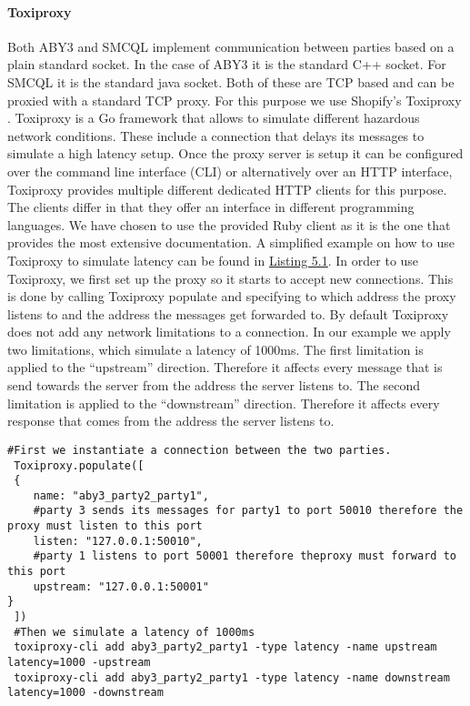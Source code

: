  \paragraph{Toxiproxy}
 Both ABY3 and SMCQL implement communication between parties based on a plain standard socket. In the case of ABY3 it is the standard C++ socket. For SMCQL it is the standard java socket. Both of these are TCP based and can be proxied with a standard TCP proxy. For this purpose we use Shopify's Toxiproxy \cite{toxiproxy}. Toxiproxy is a Go framework that allows to simulate different hazardous network conditions. These include a connection that delays its messages to simulate a high latency setup. Once the proxy server is setup it can be configured over the command line interface (CLI) or alternatively over an HTTP interface, Toxiproxy provides multiple different dedicated HTTP clients for this purpose. The clients differ in that they offer an interface in different programming languages. We have chosen to use the provided Ruby client as it is the one that provides the most extensive documentation. 
 A simplified example on how to use Toxiproxy to simulate latency can be found in \hyperref[the_label]{Listing 5.1}. In order to use Toxiproxy, we first set up the proxy so it starts to accept new connections. This is done by calling Toxiproxy populate and specifying to which address the proxy listens to and the address the messages get forwarded to.
 By default Toxiproxy does not add any network limitations to a connection. In our example we apply two limitations, which simulate a latency of 1000ms. The first limitation is applied to the ``upstream'' direction. Therefore it affects every message that is send towards the server from the address the server listens to. The second limitation is applied to the ``downstream'' direction. Therefore it affects every response that comes from the address the server listens to.    
 
 \label{Toxi_label}				
 \begin{lstlisting}[caption={Setting up a proxy that simulates latency between two parties with Toxiporxy}]
 #First we instantiate a connection between the two parties. 
 Toxiproxy.populate([
 {
 	name: "aby3_party2_party1",
 	#party 3 sends its messages for party1 to port 50010 therefore the proxy must listen to this port
 	listen: "127.0.0.1:50010",   
 	#party 1 listens to port 50001 therefore theproxy must forward to this port
 	upstream: "127.0.0.1:50001"  
}
 ])
 #Then we simulate a latency of 1000ms 
 toxiproxy-cli add aby3_party2_party1 -type latency -name upstream latency=1000 -upstream
 toxiproxy-cli add aby3_party2_party1 -type latency -name downstream latency=1000 -downstream
 
 \end{lstlisting}
